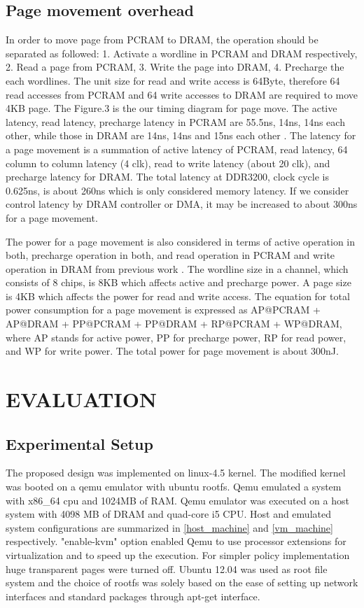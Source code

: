 \documentclass[a4paper, 11pt, conference]{ieeeconf}      %
\begin{document}
\subsection{Page movement overhead} \vspace{1mm}
In order to move page from PCRAM to DRAM, the operation should be separated as followed: 1. Activate a wordline in PCRAM and DRAM respectively, 2. Read a page from PCRAM, 3. Write the page into DRAM, 4. Precharge the each wordlines. The unit size for read and write access is 64Byte, therefore 64 read accesses from PCRAM and 64 write accesses to DRAM are required to move 4KB page. The Figure.3 is the our timing diagram for page move.  The active latency, read latency, precharge latency in PCRAM are 55.5ns, 14ns, 14ns each other, while those in DRAM are 14ns, 14ns and 15ns each other \cite{lee2009architecting}\cite{miconddr4}. The latency for a page movement is a summation of active latency of PCRAM, read latency, 64 column to column latency (4 clk), read to write latency (about 20 clk), and precharge latency for DRAM.  The total latency at DDR3200, clock cycle is 0.625ns, is about 260ns which is only considered memory latency.  If we consider control latency by DRAM controller or DMA, it may be increased to about 300ns for a page movement.

	The power for a page movement is also considered in terms of active operation in both, precharge operation in both, and read operation in PCRAM and write operation in DRAM from previous work \cite{lee2009architecting}.  The wordline size in a channel, which consists of 8 chips, is 8KB which affects active and precharge power.  A page size is 4KB which affects the power for read and write access.  The equation for total power consumption for a page movement is expressed as 
AP@PCRAM + AP@DRAM + PP@PCRAM + PP@DRAM + RP@PCRAM + WP@DRAM,
where AP stands for active power, PP for precharge power, RP for read power, and WP for write power.  The total power for page movement is about 300nJ.

\section{EVALUATION} \vspace{2mm}

\subsection{Experimental Setup}
The proposed design was implemented on linux-4.5 kernel. The modified kernel was booted on a qemu emulator with ubuntu rootfs. Qemu emulated a system with x86\_64 cpu and 1024MB of RAM. Qemu emulator was executed on a host system with 4098 MB of DRAM and quad-core i5 CPU. Host and emulated system configurations are summarized in \ref{host_machine} and \ref{vm_machine} respectively. "enable-kvm" option enabled Qemu to use processor extensions for virtualization and to speed up the execution. For simpler policy implementation huge transparent pages were turned off. Ubuntu 12.04 was used as root file system and the choice of rootfs was solely based on the ease of setting up network interfaces and standard packages through apt-get interface.
\end{document}
